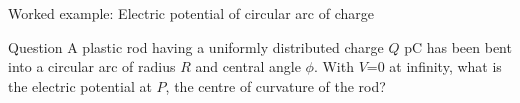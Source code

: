 %
%

{
\problemslide

%
%
%

\begin{frame}{Worked example: Electric potential of circular arc of charge}

\begin{blockexmplque}{Question}
A plastic rod having a uniformly distributed charge $Q$ pC has been bent
into a circular arc of radius $R$ and central angle $\phi$.
With $V$=0 at infinity, what is the electric potential at $P$, the centre of
curvature of the rod?
\end{blockexmplque}

\vspace{0.2cm}


\end{frame}}
